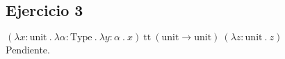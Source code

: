 \documentclass[a4paper]{article}
\begin{document}
\begin{landscape}


\newpage

\subsection{Ejercicio 3}

$(\lambda x : \text{unit}\ .\
  \lambda \alpha : \text{Type}\ .\
  \lambda y : \alpha\ .\
  x)\
 \text{tt}\ (\text{unit} \rightarrow \text{unit})\
 (\lambda z : \text{unit}\ .\
  z)$\\

Pendiente.


\end{landscape}
\end{document}
